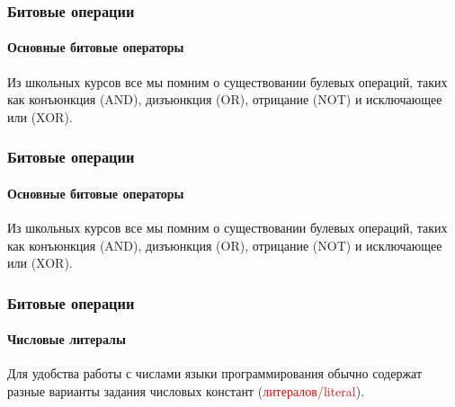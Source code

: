 \documentclass[aspectratio=169]{beamer}
\begin{document}
\begin{frame}
\frametitle{Битовые операции}
\framesubtitle{Основные битовые операторы}
\justifying
\small

Из школьных курсов все мы помним о существовании булевых операций, таких как конъюнкция (AND), дизъюнкция (OR), отрицание (NOT) и исключающее или (XOR).\newline

\begin{figure}
    \captionsetup[subfigure]{labelformat=empty}
    \centering
     \quad\quad\quad
    \newline
    
\end{figure}
\end{frame}

\begin{frame}
\frametitle{Битовые операции}
\framesubtitle{Основные битовые операторы}
\justifying
\small

Из школьных курсов все мы помним о существовании булевых операций, таких как конъюнкция (AND), дизъюнкция (OR), отрицание (NOT) и исключающее или (XOR).\newline

\begin{figure}
    \captionsetup[subfigure]{labelformat=empty}
    \centering
     \quad\quad\quad
    \newline
    
\end{figure}
\end{frame}

\begin{frame}
\frametitle{Битовые операции}
\framesubtitle{Числовые литералы}
\justifying
\small

Для удобства работы с числами языки программирования обычно содержат разные варианты задания числовых констант (\textcolor{red}{литералов/literal}).
\begin{figure}
    \captionsetup[subfigure]{labelformat=empty}
    \centering
    
\end{figure}
\end{frame}
\end{document}
